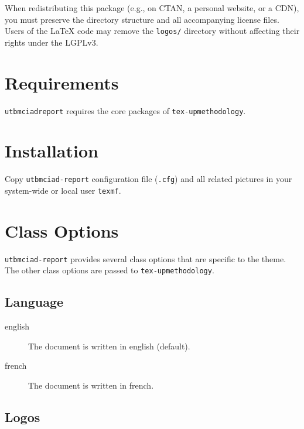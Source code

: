 \documentclass[english,article,nodocrefonfront,nodocrefonback]{utbmciadreport}
\begin{document}
When redistributing this package (e.g., on CTAN, a personal website, or a CDN), you must preserve the directory structure and all accompanying license files.  Users of the LaTeX code may remove the \texttt{logos/} directory without affecting their rights under the LGPLv3.

\section{Requirements}

\texttt{utbmciadreport} requires the core packages of \texttt{tex-upmethodology}.

\section{Installation}

Copy \texttt{utbmciad-report} configuration file (\texttt{.cfg}) and all related pictures in your system-wide or local user \texttt{texmf}.

\section{Class Options}

\texttt{utbmciad-report} provides several class options that are specific to the theme.
The other class options are passed to \texttt{tex-upmethodology}.


\subsection{Language}

\begin{description}
\item[english] The document is written in english (default).
\item[french] The document is written in french.
\end{description}

\subsection{Logos}
\end{document}
